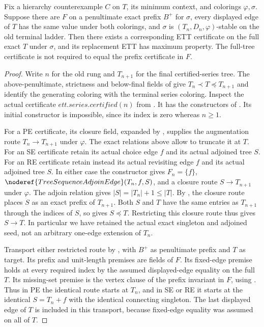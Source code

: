 \begin{lemma}
Fix a hierarchy counterexample $C$ on $T$, its minimum context, and
colorings $\varphi,\sigma$. Suppose there are
 $F$ on a penultimate exact prefix $B^+$
for $\sigma$, every displayed edge of $T$ has the same value under both
colorings, and $\sigma$ is $(T_n,D_n,\varphi)$-stable on the old terminal
ladder. Then there exists a corresponding ETT certificate on the full
exact $T$ under $\sigma$, and its replacement ETT has maximum property.
The full-tree certificate is not required to equal the prefix certificate
in $F$.
\end{lemma}
\begin{proof}
Write $n$ for the old rung and $T_{n+1}$ for the final certified-series
tree. The above-penultimate, strictness and below-final fields of
 give
$T_n\prec T\preccurlyeq T_{n+1}$ and identify the generating coloring
with the terminal series coloring. Inspect the actual certificate
$\mathit{ett.series.certified}(n)$ from .
It has the constructors of . Its initial
constructor is impossible, since its index is zero whereas $n\ge1$.

For a PE certificate, its closure field, expanded by
, supplies the augmentation route
$T_n\longrightarrow T_{n+1}$ under $\varphi$. The exact relations above
allow  to truncate it at
$T$. For an SE certificate retain its actual choice edge $f$ and its
actual adjoined tree $S$. For an RE certificate retain instead its actual
revisiting edge $f$ and its actual adjoined tree $S$. In either case the
constructor gives $F_n=\{f\}$, $\noderef{TreeSequenceAdjoinEdge}(T_n,f,S)$,
and a closure route $S\longrightarrow T_{n+1}$ under $\varphi$.
The adjoin relation gives $|S|=|T_n|+1\le|T|$.
By , the closure
route places $S$ as an exact prefix of $T_{n+1}$. Both $S$ and $T$ have
the same entries as $T_{n+1}$ through the indices of $S$, so
 gives $S\preccurlyeq T$.
Restricting this closure route thus gives $S\longrightarrow T$.
In particular we have retained the actual exact singleton and adjoined
seed, not an arbitrary one-edge extension of $T_n$.

Transport either restricted route by
, with $B^+$ as
penultimate prefix and $T$ as target. Its prefix and unit-length premises
are fields of $F$. Its fixed-edge premise holds at every required index
by the assumed displayed-edge equality on the full $T$. Its missing-set
premise is the vertex clause of the prefix invariant in $F$, using
. Thus in PE the identical route starts
at $T_n$, and in SE or RE it starts at the identical $S=T_n+f$ with the
identical connecting singleton. The last displayed edge of $T$ is included
in this transport, because fixed-edge equality was assumed on all of $T$.


\end{proof}
